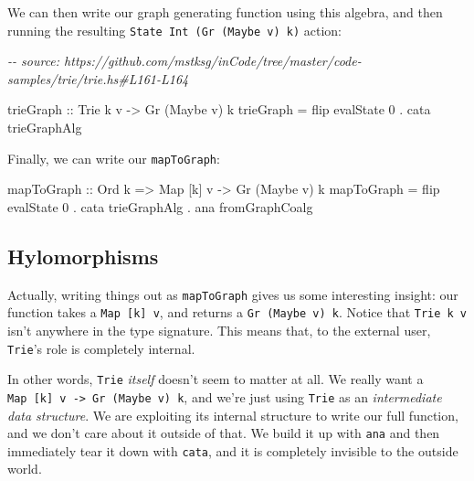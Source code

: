 \documentclass[]{article}
\newenvironment{Shaded}{}{}
\newcommand{\CommentTok}[1]{\textcolor[rgb]{0.38,0.63,0.69}{\textit{#1}}}
\newcommand{\DataTypeTok}[1]{\textcolor[rgb]{0.56,0.13,0.00}{#1}}
\newcommand{\DecValTok}[1]{\textcolor[rgb]{0.25,0.63,0.44}{#1}}
\newcommand{\FunctionTok}[1]{\textcolor[rgb]{0.02,0.16,0.49}{#1}}
\newcommand{\NormalTok}[1]{#1}
\newcommand{\OperatorTok}[1]{\textcolor[rgb]{0.40,0.40,0.40}{#1}}
\newcommand{\OtherTok}[1]{\textcolor[rgb]{0.00,0.44,0.13}{#1}}
\begin{document}
We can then write our graph generating function using this algebra, and then
running the resulting \texttt{State\ Int\ (Gr\ (Maybe\ v)\ k)} action:

\begin{Shaded}
\begin{Highlighting}[]
\CommentTok{{-}{-} source: https://github.com/mstksg/inCode/tree/master/code{-}samples/trie/trie.hs\#L161{-}L164}

\NormalTok{trieGraph}
\OtherTok{    ::} \DataTypeTok{Trie}\NormalTok{ k v}
    \OtherTok{{-}\textgreater{}} \DataTypeTok{Gr}\NormalTok{ (}\DataTypeTok{Maybe}\NormalTok{ v) k}
\NormalTok{trieGraph }\OtherTok{=} \FunctionTok{flip}\NormalTok{ evalState }\DecValTok{0} \OperatorTok{.}\NormalTok{ cata trieGraphAlg}
\end{Highlighting}
\end{Shaded}

Finally, we can write our \texttt{mapToGraph}:

\begin{Shaded}
\begin{Highlighting}[]
\NormalTok{mapToGraph}
\OtherTok{    ::} \DataTypeTok{Ord}\NormalTok{ k}
    \OtherTok{=\textgreater{}} \DataTypeTok{Map}\NormalTok{ [k] v}
    \OtherTok{{-}\textgreater{}} \DataTypeTok{Gr}\NormalTok{ (}\DataTypeTok{Maybe}\NormalTok{ v) k}
\NormalTok{mapToGraph }\OtherTok{=} \FunctionTok{flip}\NormalTok{ evalState }\DecValTok{0}
           \OperatorTok{.}\NormalTok{ cata trieGraphAlg}
           \OperatorTok{.}\NormalTok{ ana fromGraphCoalg}
\end{Highlighting}
\end{Shaded}

\subsection{Hylomorphisms}\label{hylomorphisms}

Actually, writing things out as \texttt{mapToGraph} gives us some interesting
insight: our function takes a \texttt{Map\ {[}k{]}\ v}, and returns a
\texttt{Gr\ (Maybe\ v)\ k}. Notice that \texttt{Trie\ k\ v} isn't anywhere in
the type signature. This means that, to the external user, \texttt{Trie}'s role
is completely internal.

In other words, \texttt{Trie} \emph{itself} doesn't seem to matter at all. We
really want a \texttt{Map\ {[}k{]}\ v\ -\textgreater{}\ Gr\ (Maybe\ v)\ k}, and
we're just using \texttt{Trie} as an \emph{intermediate data structure}. We are
exploiting its internal structure to write our full function, and we don't care
about it outside of that. We build it up with \texttt{ana} and then immediately
tear it down with \texttt{cata}, and it is completely invisible to the outside
world.
\end{document}
